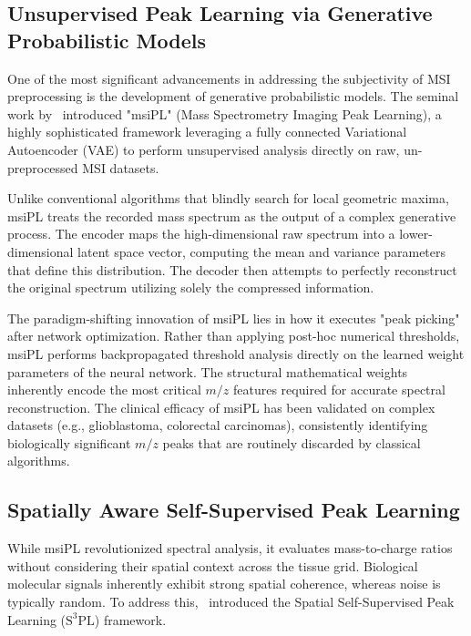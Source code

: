 \documentclass[
12pt, %
oneside, %
english, %
onehalfspacing, %
nolistspacing, %
headsepline, %
]{MastersDoctoralThesis} %
\begin{document}
\subsection{Unsupervised Peak Learning via Generative Probabilistic Models}

One of the most significant advancements in addressing the subjectivity of MSI preprocessing is the development of generative probabilistic models. The seminal work by~\citet{abdelmoula2021peak} introduced "msiPL" (Mass Spectrometry Imaging Peak Learning), a highly sophisticated framework leveraging a fully connected Variational Autoencoder (VAE) to perform unsupervised analysis directly on raw, un-preprocessed MSI datasets.

Unlike conventional algorithms that blindly search for local geometric maxima, msiPL treats the recorded mass spectrum as the output of a complex generative process. The encoder maps the high-dimensional raw spectrum into a lower-dimensional latent space vector, computing the mean and variance parameters that define this distribution. The decoder then attempts to perfectly reconstruct the original spectrum utilizing solely the compressed information.

The paradigm-shifting innovation of msiPL lies in how it executes "peak picking" after network optimization. Rather than applying post-hoc numerical thresholds, msiPL performs backpropagated threshold analysis directly on the learned weight parameters of the neural network. The structural mathematical weights inherently encode the most critical $m/z$ features required for accurate spectral reconstruction. The clinical efficacy of msiPL has been validated on complex datasets (e.g., glioblastoma, colorectal carcinomas), consistently identifying biologically significant $m/z$ peaks that are routinely discarded by classical algorithms. \citep{abdelmoula2021peak, abdelmoula2022massnet}

\subsection{Spatially Aware Self-Supervised Peak Learning}

While msiPL revolutionized spectral analysis, it evaluates mass-to-charge ratios without considering their spatial context across the tissue grid. Biological molecular signals inherently exhibit strong spatial coherence, whereas noise is typically random. To address this,~\citet{weigand2026spatial} introduced the Spatial Self-Supervised Peak Learning ($\text{S}^{3}\text{PL}$) framework.
\end{document}
